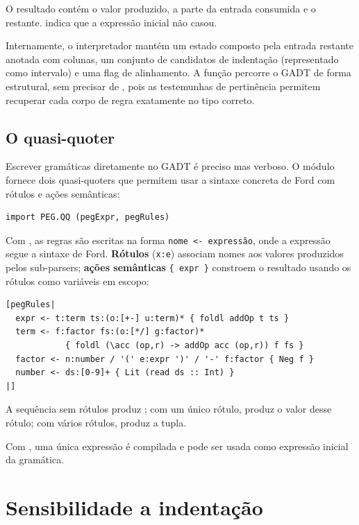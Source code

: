 O resultado  contém o valor produzido, a
parte da entrada consumida e o restante.  indica que a
expressão inicial não casou.

Internamente, o interpretador mantém um estado 
composto pela entrada restante anotada com colunas, um conjunto de
candidatos de indentação (representado como intervalo) e uma flag de
alinhamento. A função  percorre o GADT  de
forma estrutural, sem precisar de , pois as
testemunhas de pertinência  permitem recuperar cada
corpo de regra exatamente no tipo correto.

\subsection{O quasi-quoter}

Escrever gramáticas diretamente no GADT  é preciso mas
verboso. O módulo  fornece dois quasi-quoters que
permitem usar a sintaxe concreta de Ford com rótulos e ações semânticas:

\begin{verbatim}
import PEG.QQ (pegExpr, pegRules)
\end{verbatim}

Com \haskell{[pegRules| ... |]}, as regras são escritas na forma
\verb|nome <- expressão|, onde a expressão segue a sintaxe de Ford.
\textbf{Rótulos} (\verb|x:e|) associam nomes aos valores produzidos
pelos sub-parsers; \textbf{ações semânticas} \verb|{ expr }| constroem
o resultado usando os rótulos como variáveis em escopo:

\begin{verbatim}
[pegRules|
  expr <- t:term ts:(o:[+-] u:term)* { foldl addOp t ts }
  term <- f:factor fs:(o:[*/] g:factor)*
            { foldl (\acc (op,r) -> addOp acc (op,r)) f fs }
  factor <- n:number / '(' e:expr ')' / '-' f:factor { Neg f }
  number <- ds:[0-9]+ { Lit (read ds :: Int) }
|]
\end{verbatim}

A sequência sem rótulos produz \haskell{()}; com um único rótulo,
produz o valor desse rótulo; com vários rótulos, produz a tupla.

Com \haskell{[pegExpr| ... |]}, uma única expressão é compilada e
pode ser usada como expressão inicial da gramática.

\section{Sensibilidade a indentação}
\label{sec:peg-indent}

